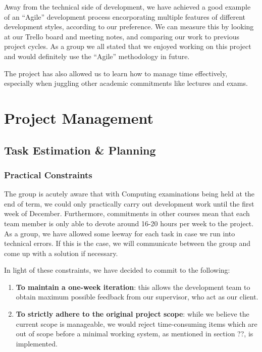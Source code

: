 \documentclass[a4paper, titlepage]{article}
\begin{document}
Away from the technical side of development, we have achieved a good example of an ``Agile'' development
process encorporating multiple features of different development styles, according to our preference. 
We can measure this by looking at our Trello board and meeting notes, and comparing our work to 
previous project cycles. As a group we all stated that we enjoyed working on this project and would 
definitely use the ``Agile'' methodology in future. 

The project has also allowed us to learn how to manage time effectively, especially when juggling 
other academic commitments like lectures and exams. 


\newpage
\section{Project Management}

\subsection{Task Estimation \& Planning}

\subsubsection{Practical Constraints}
The group is acutely aware that with Computing examinations being held at the
end of term, we could only practically carry out development work until the
first week of December. Furthermore, commitments in other courses mean that 
each team member is only able to devote around 16-20 hours per week to
the project. As a group, we have allowed some leeway for each task in case we run into technical errors. If this is the case, we will communicate between the group and come up with a solution if necessary.

In light of these constraints, we have decided to commit to the following:
\begin{enumerate}
  \item \textbf{To maintain a one-week iteration}: this allows the development team to
        obtain maximum possible feedback from our supervisor, who act as our client.
  \item \textbf{To strictly adhere to the original project scope}: while we believe the
        current scope is manageable, we would reject time-consuming items which
        are out of scope before a minimal working system, as mentioned in section ??, is implemented.
\end{enumerate}
\end{document}
